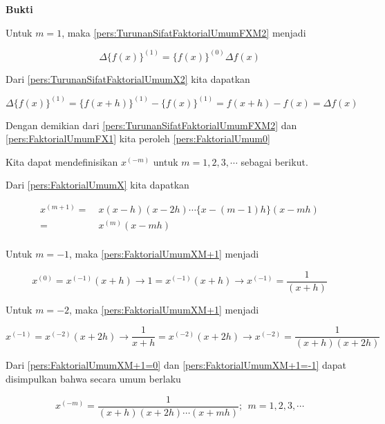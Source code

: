 \textbf{Bukti}

Untuk $m = 1$, maka \ref{pers:TurunanSifatFaktorialUmumFXM2} menjadi

\begin{equation}\label{pers:BuktiFaktorialUmum0}
\Delta \{f(x)\}^{(1)} = \{f(x)\}^{(0)}\Delta f(x)
\end{equation}

Dari \ref{pers:TurunanSifatFaktorialUmumX2} kita dapatkan

\begin{equation}\label{pers:FaktorialUmumFX1}
\Delta\{f(x)\}^{(1)} = \{f(x+h)\}^{(1)} - \{f(x)\}^{(1)} = f(x+h) - f(x) = \Delta f(x)
\end{equation}

Dengan demikian dari \ref{pers:TurunanSifatFaktorialUmumFXM2} dan \ref{pers:FaktorialUmumFX1} kita peroleh \ref{pers:FaktorialUmum0}

Kita dapat mendefinisikan $x^{(-m)}$ untuk $m = 1,2,3, \cdots$ sebagai berikut.

Dari \ref{pers:FaktorialUmumX} kita dapatkan

\begin{equation}
\begin{split}\label{pers:FaktorialUmumXM+1}
x^{(m+1)} =~& x(x-h) (x-2h)\cdots\{x-(m-1)h\}(x-mh)\\
=~& x^{(m)}(x-mh)\\
\end{split}
\end{equation}

Untuk $m=-1$, maka \ref{pers:FaktorialUmumXM+1} menjadi

\begin{equation}\label{pers:FaktorialUmumXM+1=0}
x^{(0)} = x^{(-1)}(x+h) \rightarrow 1 = x^{(-1)}(x+h) \rightarrow x^{(-1)} = \frac{1}{(x+h)}
\end{equation}

Untuk $m=-2$, maka \ref{pers:FaktorialUmumXM+1} menjadi

\begin{equation}\label{pers:FaktorialUmumXM+1=-1}
x^{(-1)} = x^{(-2)}(x+2h) \rightarrow \frac{1}{x+h} = x^{(-2)}(x+2h) \rightarrow x^{(-2)} = \frac{1}{(x+h)(x+2h)}
\end{equation}

Dari \ref{pers:FaktorialUmumXM+1=0} dan \ref{pers:FaktorialUmumXM+1=-1} dapat disimpulkan bahwa secara umum berlaku

\begin{equation}\label{pers:FaktorialUmumX-1}
\boxed{x^{(-m)} = \frac{1}{(x+h)(x+2h)\cdots (x+mh)};~~m=1,2,3,\cdots}
\end{equation}

